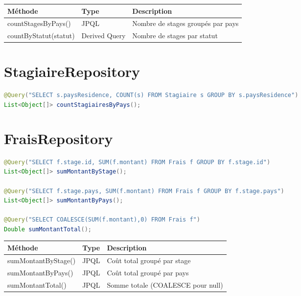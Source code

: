 \documentclass[12pt,a4paper]{report}
\begin{document}
\begin{table}[H]
\centering
\begin{tabular}{|l|l|p{6cm}|}
\hline
\textbf{Méthode} & \textbf{Type} & \textbf{Description} \\ \hline
countStagesByPays() & JPQL & Nombre de stages groupés par pays \\ \hline
countByStatut(statut) & Derived Query & Nombre de stages par statut \\ \hline
\end{tabular}
\end{table}

\section{StagiaireRepository}

\begin{lstlisting}[language=Java, caption=StagiaireRepository --- Requêtes personnalisées]
@Query("SELECT s.paysResidence, COUNT(s) FROM Stagiaire s GROUP BY s.paysResidence")
List<Object[]> countStagiairesByPays();
\end{lstlisting}

\section{FraisRepository}

\begin{lstlisting}[language=Java, caption=FraisRepository --- Requêtes personnalisées]
@Query("SELECT f.stage.id, SUM(f.montant) FROM Frais f GROUP BY f.stage.id")
List<Object[]> sumMontantByStage();

@Query("SELECT f.stage.pays, SUM(f.montant) FROM Frais f GROUP BY f.stage.pays")
List<Object[]> sumMontantByPays();

@Query("SELECT COALESCE(SUM(f.montant),0) FROM Frais f")
Double sumMontantTotal();
\end{lstlisting}

\begin{table}[H]
\centering
\begin{tabular}{|l|l|p{6cm}|}
\hline
\textbf{Méthode} & \textbf{Type} & \textbf{Description} \\ \hline
sumMontantByStage() & JPQL & Coût total groupé par stage \\ \hline
sumMontantByPays() & JPQL & Coût total groupé par pays \\ \hline
sumMontantTotal() & JPQL & Somme totale (COALESCE pour null) \\ \hline
\end{tabular}
\end{table}
\end{document}
